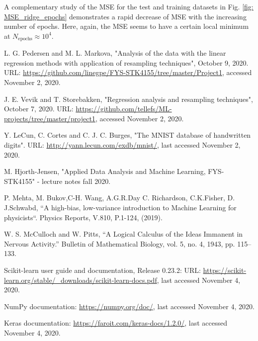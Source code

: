 \documentclass{emulateapj}
\begin{document}
A complementary study of the MSE for the test and training datasets in Fig. \ref{fig: MSE_ridge_epochs} demonstrates a rapid decrease of MSE with the increasing number of epochs. Here, again, the MSE seems to have a certain local minimum at $N_{\mathrm{epochs}}\approx10^4$. 

\newpage
\begin{thebibliography}

L. G. Pedersen and M. L. Markova, "Analysis of the data with the linear regression methods with application of resampling techniques", October 9, 2020. URL: \url{https://github.com/linegpe/FYS-STK4155/tree/master/Project1}, accessed November 2, 2020.

J. E. Vevik and T. Storebakken, "Regression analysis and resampling techniques", October 7, 2020. URL: \url{https://github.com/tellefs/ML-projects/tree/master/project1}, accessed November 2, 2020.

Y. LeCun, C. Cortes and C. J. C. Burges, "The MNIST database of handwritten digits". URL: \url{http://yann.lecun.com/exdb/mnist/}, last accessed November 2, 2020.

M. Hjorth-Jensen, "Applied Data Analysis and Machine Learning, FYS-STK4155" - lecture notes fall 2020.

P. Mehta, M. Bukov,C-H. Wang, A.G.R.Day C. Richardson, C.K.Fisher, D. J.Schwabd, “A high-bias, low-variance introduction to Machine Learning for physicists“. Physics Reports, V.810, P.1-124, (2019).


W. S. McCulloch and W. Pitts, “A Logical Calculus of the Ideas Immanent in Nervous Activity.” Bulletin of Mathematical Biology, vol. 5, no. 4, 1943, pp. 115–133.

Scikit-learn user guide and documentation, Release 0.23.2: URL: \url{https://scikit-learn.org/stable/_downloads/scikit-learn-docs.pdf}, last accessed November 4, 2020.

NumPy documentation: \url{https://numpy.org/doc/}, last accessed November 4, 2020.

Keras documentation:
\url{https://faroit.com/keras-docs/1.2.0/}, last accessed November 4, 2020.

\end{thebibliography} 
\end{document}
